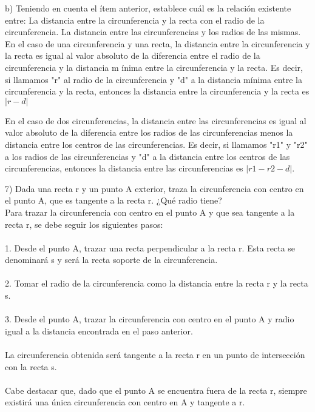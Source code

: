 \documentclass{article}
\begin{document}
b) Teniendo en cuenta el ítem anterior, establece cuál es la relación existente entre: La distancia entre la circunferencia y la recta con el radio de la circunferencia. La distancia entre las circunferencias y los radios de las mismas. \\

En el caso de una circunferencia y una recta, la distancia entre la circunferencia y la recta es igual al valor absoluto de
la diferencia entre el radio de la circunferencia y la distancia m
ínima entre la circunferencia y la recta. Es decir, si llamamos "r" al radio de la circunferencia y "d" a la distancia mínima entre
la circunferencia y la recta, entonces la distancia entre la circunferencia y la recta es $|r-d|$

En el caso de dos circunferencias, la distancia entre las circunferencias es igual al valor absoluto de la diferencia entre los radios de las circunferencias menos la distancia entre los centros de
las circunferencias. Es decir, si llamamos "r1" y "r2" a los radios de las circunferencias y "d" a la distancia entre los centros de las circunferencias, entonces la distancia entre las circunferencias es $|r1 - r2 - d|$.

7) Dada una recta r y un punto A exterior, traza la circunferencia con centro en el punto A, que es tangente a la recta r. ¿Qué radio tiene? \\

Para trazar la circunferencia con centro en el punto A y que sea tangente a la recta r, se debe seguir los siguientes pasos: \\
 \\
1. Desde el punto A, trazar una recta perpendicular a la recta r. Esta recta se denominará s y será la recta soporte de la circunferencia. \\
 \\
2. Tomar el radio de la circunferencia como la distancia entre la recta r y la recta s. \\
 \\
3. Desde el punto A, trazar la circunferencia con centro en el punto A y radio igual a la distancia encontrada en el paso anterior. \\
 \\
La circunferencia obtenida será tangente a la recta r en un punto de intersección con la recta s. \\
 \\
Cabe destacar que, dado que el punto A se encuentra fuera de la recta r, siempre existirá una única circunferencia con centro en A y tangente a r. \\
\end{document}

